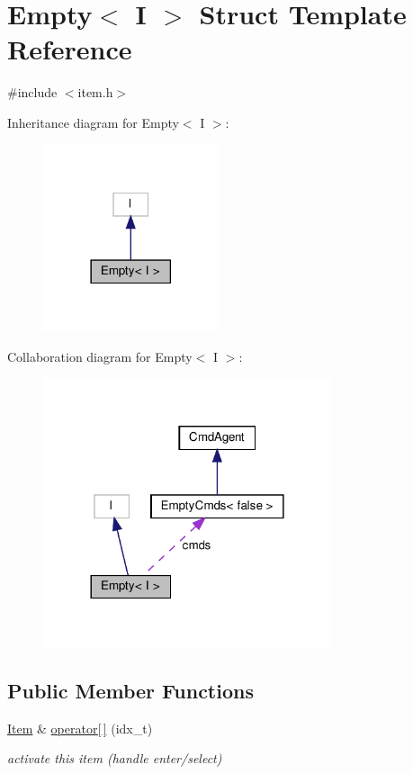 \hypertarget{structEmpty}{}\section{Empty$<$ I $>$ Struct Template Reference}
\label{structEmpty}


{\ttfamily \#include $<$item.\+h$>$}



Inheritance diagram for Empty$<$ I $>$\+:\nopagebreak
\begin{figure}[H]
\begin{center}
\leavevmode
\includegraphics[width=146pt]{structEmpty__inherit__graph}
\end{center}
\end{figure}


Collaboration diagram for Empty$<$ I $>$\+:\nopagebreak
\begin{figure}[H]
\begin{center}
\leavevmode
\includegraphics[width=240pt]{structEmpty__coll__graph}
\end{center}
\end{figure}
\subsection*{Public Member Functions}
\begin{DoxyCompactItemize}
\item 
\hyperlink{structItem}{Item} \& \hyperlink{structEmpty_a773bc9093a9594a8227141c9f4f0618f}{operator\mbox{[}$\,$\mbox{]}} (idx\+\_\+t)
\begin{DoxyCompactList}\small\item\em activate this item (handle enter/select) \end{DoxyCompactList}\end{DoxyCompactItemize}
